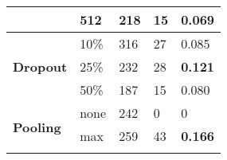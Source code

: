 \begin{table}[t]
\begin{tabular}{|l||l|l|l|l|}
                                                                                       & 512                                                              & 218                                                                   & 15                                                                         & 0.069                                                                     \\ \hline\hline
    \multirow{3}{*}{\textbf{Dropout}}                                                  & 10\%                                                             & 316                                                                   & 27                                                                         & 0.085                                                                     \\ \cline{2-5} 
                                                                                       & 25\%                                                             & 232                                                                   & 28                                                                         & \textbf{0.121}                                                            \\ \cline{2-5} 
                                                                                       & 50\%                                                             & 187                                                                   & 15                                                                         & 0.080                                                                     \\ \hline\hline
    \multirow{3}{*}{\textbf{Pooling}}                                                  & none                                                             & 242                                                                   & 0                                                                          & 0                                                                         \\ \cline{2-5} 
                                                                                       & max                                                              & 259                                                                   & 43                                                                         & \textbf{0.166}                                                            \\ \cline{2-5} 

\end{tabular}
\end{table}
